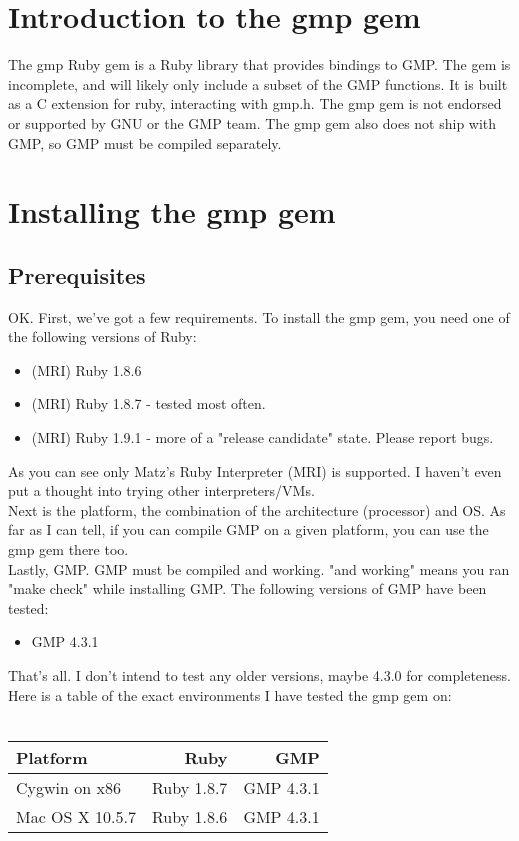 \documentclass[pdftex,10pt]{article}
\begin{document}
\section{Introduction to the gmp gem}

The gmp Ruby gem is a Ruby library that provides bindings to GMP. The gem is
incomplete, and will likely only include a subset of the GMP functions. It is
built as a C extension for ruby, interacting with gmp.h. The gmp gem is not
endorsed or supported by GNU or the GMP team. The gmp gem also does not ship
with GMP, so GMP must be compiled separately.

\section{Installing the gmp gem}

\subsection{Prerequisites}
OK. First, we've got a few requirements. To install the gmp gem, you need one
of the following versions of Ruby:
\begin{itemize}
  \item (MRI) Ruby 1.8.6
  \item (MRI) Ruby 1.8.7 - tested most often.
  \item (MRI) Ruby 1.9.1 - more of a "release candidate" state. Please report
    bugs.
\end{itemize}
As you can see only Matz's Ruby Interpreter (MRI) is supported. I haven't even
put a thought into trying other interpreters/VMs.\\

Next is the platform, the combination of the architecture (processor) and OS.
As far as I can tell, if you can compile GMP on a given platform, you can use
the gmp gem there too.\\

Lastly, GMP. GMP must be compiled and working. "and working" means you ran "make check" while installing GMP. The following versions of GMP have been tested:
\begin{itemize}
  \item GMP 4.3.1
\end{itemize}

That's all. I don't intend to test any older versions, maybe 4.3.0 for completeness.\\

Here is a table of the exact environments I have tested the gmp gem on:\\
\\
\begin{tabular}{|l|r|r|} \hline
  Platform & Ruby & GMP \\ \hline
  Cygwin on x86   & Ruby 1.8.7 & GMP 4.3.1 \\
  Mac OS X 10.5.7 & Ruby 1.8.6 & GMP 4.3.1 \\ \hline
\end{tabular}
\end{document}
